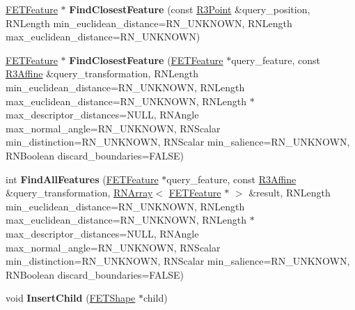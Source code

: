 \begin{DoxyCompactItemize}
\item 
\hyperlink{struct_f_e_t_feature}{F\+E\+T\+Feature} $\ast$ {\bfseries Find\+Closest\+Feature} (const \hyperlink{class_r3_point}{R3\+Point} \&query\+\_\+position, R\+N\+Length min\+\_\+euclidean\+\_\+distance=R\+N\+\_\+\+U\+N\+K\+N\+O\+WN, R\+N\+Length max\+\_\+euclidean\+\_\+distance=R\+N\+\_\+\+U\+N\+K\+N\+O\+WN)\hypertarget{struct_f_e_t_shape_a8a0d292edcd8bb7626895a5964317836}{}\label{struct_f_e_t_shape_a8a0d292edcd8bb7626895a5964317836}

\item 
\hyperlink{struct_f_e_t_feature}{F\+E\+T\+Feature} $\ast$ {\bfseries Find\+Closest\+Feature} (\hyperlink{struct_f_e_t_feature}{F\+E\+T\+Feature} $\ast$query\+\_\+feature, const \hyperlink{class_r3_affine}{R3\+Affine} \&query\+\_\+transformation, R\+N\+Length min\+\_\+euclidean\+\_\+distance=R\+N\+\_\+\+U\+N\+K\+N\+O\+WN, R\+N\+Length max\+\_\+euclidean\+\_\+distance=R\+N\+\_\+\+U\+N\+K\+N\+O\+WN, R\+N\+Length $\ast$max\+\_\+descriptor\+\_\+distances=N\+U\+LL, R\+N\+Angle max\+\_\+normal\+\_\+angle=R\+N\+\_\+\+U\+N\+K\+N\+O\+WN, R\+N\+Scalar min\+\_\+distinction=R\+N\+\_\+\+U\+N\+K\+N\+O\+WN, R\+N\+Scalar min\+\_\+salience=R\+N\+\_\+\+U\+N\+K\+N\+O\+WN, R\+N\+Boolean discard\+\_\+boundaries=F\+A\+L\+SE)\hypertarget{struct_f_e_t_shape_aa306d9a70a32e5a28e3b70c64ba991d3}{}\label{struct_f_e_t_shape_aa306d9a70a32e5a28e3b70c64ba991d3}

\item 
int {\bfseries Find\+All\+Features} (\hyperlink{struct_f_e_t_feature}{F\+E\+T\+Feature} $\ast$query\+\_\+feature, const \hyperlink{class_r3_affine}{R3\+Affine} \&query\+\_\+transformation, \hyperlink{class_r_n_array}{R\+N\+Array}$<$ \hyperlink{struct_f_e_t_feature}{F\+E\+T\+Feature} $\ast$ $>$ \&result, R\+N\+Length min\+\_\+euclidean\+\_\+distance=R\+N\+\_\+\+U\+N\+K\+N\+O\+WN, R\+N\+Length max\+\_\+euclidean\+\_\+distance=R\+N\+\_\+\+U\+N\+K\+N\+O\+WN, R\+N\+Length $\ast$max\+\_\+descriptor\+\_\+distances=N\+U\+LL, R\+N\+Angle max\+\_\+normal\+\_\+angle=R\+N\+\_\+\+U\+N\+K\+N\+O\+WN, R\+N\+Scalar min\+\_\+distinction=R\+N\+\_\+\+U\+N\+K\+N\+O\+WN, R\+N\+Scalar min\+\_\+salience=R\+N\+\_\+\+U\+N\+K\+N\+O\+WN, R\+N\+Boolean discard\+\_\+boundaries=F\+A\+L\+SE)\hypertarget{struct_f_e_t_shape_a11f7827003a0b7e69816b7e5f15f2e37}{}\label{struct_f_e_t_shape_a11f7827003a0b7e69816b7e5f15f2e37}

\item 
void {\bfseries Insert\+Child} (\hyperlink{struct_f_e_t_shape}{F\+E\+T\+Shape} $\ast$child)\hypertarget{struct_f_e_t_shape_a750af5d463bfea565f5a5595f9deb346}{}\label{struct_f_e_t_shape_a750af5d463bfea565f5a5595f9deb346}


\end{DoxyCompactItemize}
